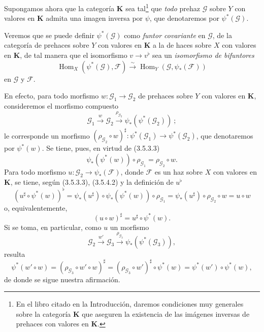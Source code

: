
\begin{env}[3.5.4]
\label{0.3.5.4-fr}
Supongamos ahora que la categoría $\boldsymbol{K}$ sea tal\footnote{En
el libro citado en la Introducción, daremos condiciones muy
generales sobre la categoría $\boldsymbol{K}$ que aseguren la existencia de las imágenes
inversas de prehaces con valores en $\boldsymbol{K}$.} que \emph{todo}
prehaz $\mathcal{G}$ sobre $Y$ con valores en $\boldsymbol{K}$ admita una
imagen inversa por $\psi$, que denotaremos por $\psi^*(\mathcal{G})$.

Veremos que se puede definir $\psi^*(\mathcal{G})$ como \emph{funtor
covariante} en $\mathcal{G}$, de la categoría de prehaces sobre $Y$ con
valores en $\boldsymbol{K}$ a la de haces sobre $X$ con valores en
$\boldsymbol{K}$, de tal manera que el isomorfismo $v\to v^\flat$ sea un
\emph{isomorfismo de bifuntores}
\begin{equation*}
  \operatorname{Hom}_X(\psi^*(\mathcal{G}),\mathcal{F})
  \xrightarrow{\sim}
  \operatorname{Hom}_Y(\mathcal{G},\psi_*(\mathcal{F}))
\tag{3.5.4.1}\label{0.3.5.4.1-fr}
\end{equation*}
en $\mathcal{G}$ y $\mathcal{F}$.

En efecto, para todo morfismo
$w:\mathcal{G}_1\to\mathcal{G}_2$ de prehaces sobre $Y$ con valores en
$\boldsymbol{K}$, consideremos el morfismo compuesto
\[
  \mathcal{G}_1\xrightarrow{w}\mathcal{G}_2
  \xrightarrow{\rho_{\mathcal{G}_2}}
  \psi_*(\psi^*(\mathcal{G}_2))~;
\]
le corresponde un morfismo
$(\rho_{\mathcal{G}_2}\circ w)^\sharp:
\psi^*(\mathcal{G}_1)\to\psi^*(\mathcal{G}_2)$, que denotaremos por
$\psi^*(w)$. Se tiene, pues, en virtud de (3.5.3.3)
\begin{equation*}
  \psi_*(\psi^*(w))\circ\rho_{\mathcal{G}_1}
  =\rho_{\mathcal{G}_2}\circ w.
\tag{3.5.4.2}\label{0.3.5.4.2-fr}
\end{equation*}
Para todo morfismo $u:\mathcal{G}_2\to\psi_*(\mathcal{F})$, donde
$\mathcal{F}$ es un haz sobre $X$ con valores en $\boldsymbol{K}$, se tiene,
según (3.5.3.3), (3.5.4.2) y la definición de $u^\flat$
\[
  (u^\sharp\circ\psi^*(w))^\flat
  =\psi_*(u^\sharp)\circ\psi_*(\psi^*(w))\circ\rho_{\mathcal{G}_1}
  =\psi_*(u^\sharp)\circ\rho_{\mathcal{G}_2}\circ w
  =u\circ w
\]
o, equivalentemente,
\begin{equation*}
  (u\circ w)^\sharp=u^\sharp\circ\psi^*(w).
\tag{3.5.4.3}\label{0.3.5.4.3-fr}
\end{equation*}
Si se toma, en particular, como $u$ un morfismo
\[
  \mathcal{G}_2\xrightarrow{w'}\mathcal{G}_3
  \xrightarrow{\rho_{\mathcal{G}_3}}
  \psi_*(\psi^*(\mathcal{G}_3)),
\]
resulta
\[
  \psi^*(w'\circ w)
  =(\rho_{\mathcal{G}_3}\circ w'\circ w)^\sharp
  =(\rho_{\mathcal{G}_3}\circ w')^\sharp\circ\psi^*(w)
  =\psi^*(w')\circ\psi^*(w),
\]
de donde se sigue nuestra afirmación.


\end{env}
